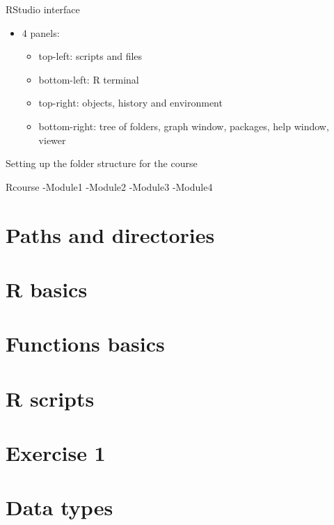 \documentclass[]{book}
\providecommand{\tightlist}{%
  \setlength{\itemsep}{0pt}\setlength{\parskip}{0pt}}
\begin{document}
RStudio interface

\begin{itemize}
\tightlist
\item
  4 panels:

  \begin{itemize}
  \tightlist
  \item
    top-left: scripts and files
  \item
    bottom-left: R terminal
  \item
    top-right: objects, history and environment
  \item
    bottom-right: tree of folders, graph window, packages, help window,
    viewer
  \end{itemize}
\end{itemize}

Setting up the folder structure for the course

Rcourse \textbar{}-Module1 \textbar{}-Module2 \textbar{}-Module3
\textbar{}-Module4

\chapter{Paths and directories}\label{paths-and-directories}

\chapter{R basics}\label{r-basics}

\chapter{Functions basics}\label{functions-basics}

\chapter{R scripts}\label{r-scripts}

\chapter{Exercise 1}\label{exercise-1}

\chapter{Data types}\label{data-types}


\end{document}
